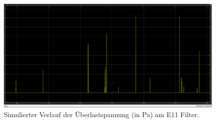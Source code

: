     \begin{figure}
        \includegraphics[height=0.85\textwidth,angle=90,origin=c]{images/sim_verlauf_uberlast.png}
        \caption[Simulierter Verlauf der Überlastspannung am E11 Filter]{Simulierter Verlauf der Überlastspannung (in Pa) am E11 Filter.}
        \label{fi:sim_verlauf_uberlast}
        \end{figure}
        \ \newpage
